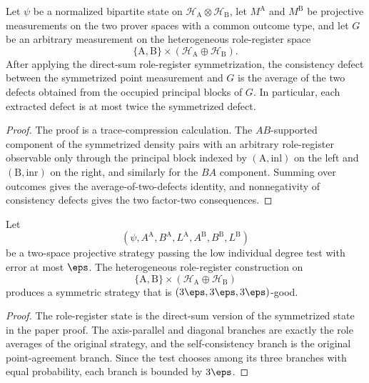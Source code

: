 \begin{lemma}\label{lem:heterogeneous-role-register-unsymmetrization}
	\leanok
	Let \(\psi\) be a normalized bipartite state on
	\(\mathcal H_{\mathrm A}\otimes\mathcal H_{\mathrm B}\), let
	\(M^{\mathrm A}\) and \(M^{\mathrm B}\) be projective measurements on the two
	prover spaces with a common outcome type, and let \(G\) be an arbitrary
	measurement on the heterogeneous role-register space
	\[
		\{\mathrm A,\mathrm B\}\times(\mathcal H_{\mathrm A}\oplus\mathcal H_{\mathrm B}).
	\]
	After applying the direct-sum role-register symmetrization, the consistency
	defect between the symmetrized point measurement and \(G\) is the average of
	the two defects obtained from the occupied principal blocks of \(G\).  In
	particular, each extracted defect is at most twice the symmetrized defect.
\end{lemma}
\begin{proof}
	\leanok
	The proof is a trace-compression calculation.  The \(AB\)-supported component
	of the symmetrized density pairs with an arbitrary role-register observable
	only through the principal block indexed by
	\((\mathrm A,\mathrm{inl})\) on the left and
	\((\mathrm B,\mathrm{inr})\) on the right, and similarly for the \(BA\)
	component.  Summing over outcomes gives the average-of-two-defects identity,
	and nonnegativity of consistency defects gives the two factor-two
	consequences.
\end{proof}

\begin{lemma}\label{lem:heterogeneous-role-register-symmetrization}
	\leanok
	Let
	\[
		(\psi,A^{\mathrm A},B^{\mathrm A},L^{\mathrm A},
		A^{\mathrm B},B^{\mathrm B},L^{\mathrm B})
	\]
	be a two-space projective strategy passing the low individual degree test
	with error at most \(\eps\).  The heterogeneous role-register construction
	on
	\[
		\{\mathrm A,\mathrm B\}\times
		(\mathcal H_{\mathrm A}\oplus\mathcal H_{\mathrm B})
	\]
	produces a symmetric strategy that is
	\((3\eps,3\eps,3\eps)\)-good.
\end{lemma}
\begin{proof}
	\leanok
	The role-register state is the direct-sum version of the symmetrized state in
	the paper proof.  The axis-parallel and diagonal branches are exactly the
	role averages of the original strategy, and the self-consistency branch is
	the original point-agreement branch.  Since the test chooses among its three
	branches with equal probability, each branch is bounded by \(3\eps\).
\end{proof}

